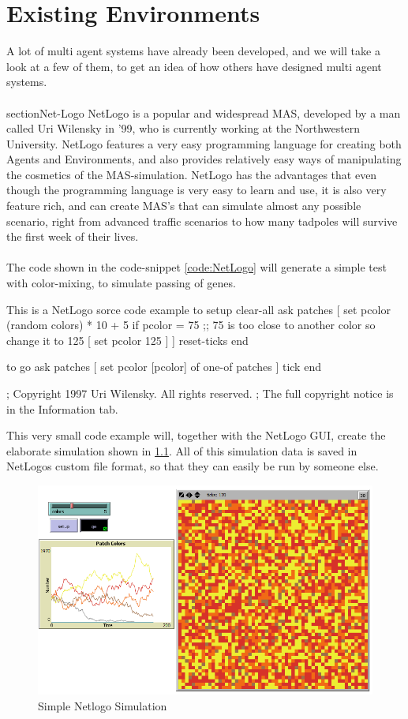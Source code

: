 \chapter{Existing Environments}

A lot of multi agent systems have already been developed, and we will take a look at a few of them, to get an idea of how others have designed multi agent systems.\\
\\
section{Net-Logo}
NetLogo is a popular and widespread MAS, developed by a man called Uri Wilensky in '99, who is currently working at the Northwestern University. \cite{misc:northwestern}
\indent NetLogo features a very easy programming language for creating both Agents and Environments, and also provides relatively easy ways of manipulating the cosmetics of the MAS-simulation. NetLogo has the advantages that even though the programming language is very easy to learn and use, it is also very feature rich, and can create MAS's that can simulate almost any possible scenario, right from advanced traffic scenarios to how many tadpoles will survive the first week of their lives. \\
\\
The code shown in the code-snippet \ref{code:NetLogo} will generate a simple test with color-mixing, to simulate passing of genes.

\begin{NetLogo}{This is a NetLogo sorce code example \label{code:NetLogo}}{}
to setup
  clear-all
  ask patches
    [ set pcolor (random colors) * 10 + 5
        if pcolor = 75  ;; 75 is too close to another color so change it to 125
          [ set pcolor 125 ] ]
  reset-ticks
end

to go
  ask patches [ set pcolor [pcolor] of one-of patches ]
  tick
end


; Copyright 1997 Uri Wilensky. All rights reserved.
; The full copyright notice is in the Information tab.
\end{NetLogo}

This very small code example will, together with the NetLogo GUI, create the elaborate simulation shown in \ref{fig:NetLogoscreen}. All of this simulation data is saved in NetLogos custom file format, so that they can easily be run by someone else.

\begin{figure}[H]
\begin{center}
\includegraphics[width=\textwidth*0.9]{Images/NetLogo.png}%
\end{center}
\caption{Simple Netlogo Simulation}%
\label{fig:NetLogoscreen}%
\end{figure}

